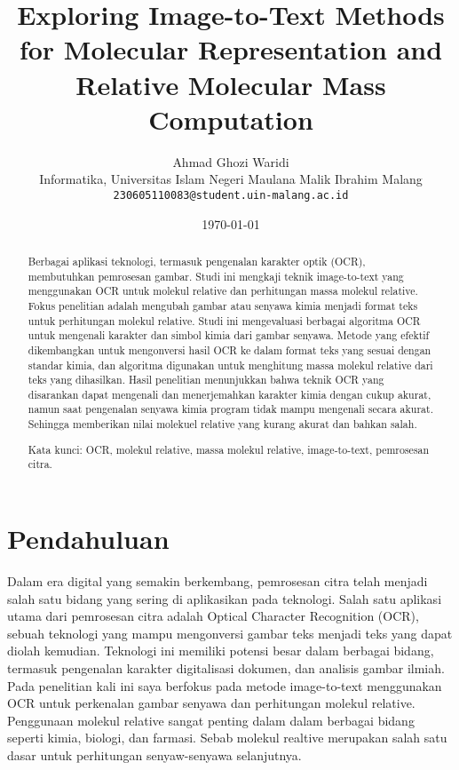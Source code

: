 \documentclass[12pt]{article}
\title{
    \fontsize{17.28pt}{12pt}\textbf{
        Exploring Image-to-Text Methods for Molecular Representation and Relative Molecular Mass Computation
    }
}
\author{Ahmad Ghozi Waridi \\ Informatika, Universitas Islam Negeri Maulana Malik Ibrahim Malang \\  \texttt{230605110083@student.uin-malang.ac.id}}
\date{\today}
\begin{document}
\leftskip=1cm
\rightskip=1cm
\vspace{10cm}
\maketitle  

\begin{abstract}
    \sloppy
    \fontsize{12pt}{20pt}\selectfont Berbagai aplikasi teknologi, termasuk pengenalan karakter optik (OCR), membutuhkan pemrosesan gambar. Studi ini mengkaji teknik image-to-text yang menggunakan OCR untuk molekul relative dan perhitungan massa molekul relative. Fokus penelitian adalah mengubah gambar atau senyawa kimia menjadi format teks untuk perhitungan molekul relative. Studi ini mengevaluasi berbagai algoritma OCR untuk mengenali karakter dan simbol kimia dari gambar senyawa. Metode yang efektif dikembangkan untuk mengonversi hasil OCR ke dalam format teks yang sesuai dengan standar kimia, dan algoritma digunakan untuk menghitung massa molekul relative dari teks yang dihasilkan. Hasil penelitian menunjukkan bahwa teknik OCR yang disarankan dapat mengenali dan menerjemahkan karakter kimia dengan cukup akurat, namun saat pengenalan senyawa kimia program tidak mampu mengenali secara akurat. Sehingga memberikan nilai molekuel relative yang kurang akurat dan bahkan salah.\vspace{1em}

    Kata kunci: OCR, molekul relative, massa molekul relative, image-to-text, pemrosesan citra. 
\end{abstract}

\section{Pendahuluan}

    \sloppy
    \fontsize{12pt}{20pt}\selectfont 
    Dalam era digital yang semakin berkembang, pemrosesan citra telah menjadi salah satu bidang yang sering di aplikasikan pada teknologi. Salah satu aplikasi utama dari pemrosesan citra adalah Optical Character Recognition (OCR), sebuah teknologi  yang mampu mengonversi gambar teks menjadi teks yang dapat diolah kemudian. Teknologi ini memiliki potensi besar dalam berbagai bidang, termasuk pengenalan  karakter digitalisasi dokumen, dan analisis gambar ilmiah. Pada penelitian kali ini saya berfokus pada metode image-to-text menggunakan OCR untuk perkenalan gambar senyawa dan perhitungan molekul relative. Penggunaan molekul relative sangat penting dalam dalam berbagai bidang seperti kimia, biologi,  dan farmasi. Sebab molekul realtive merupakan salah satu dasar untuk perhitungan senyaw-senyawa selanjutnya.\vspace{1em}
\end{document}

